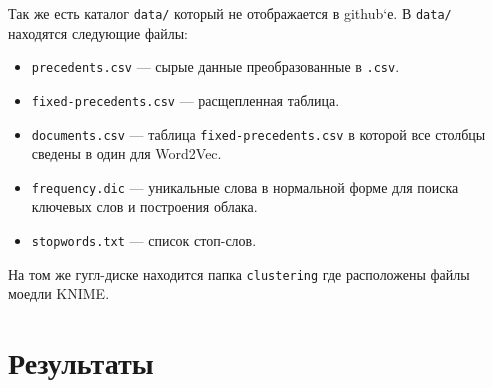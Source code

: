 \documentclass{article}
\begin{document}
Так же есть каталог \texttt{data/} который не отображается в github`е.
В \texttt{data/} находятся следующие файлы:
\begin{itemize}
    \item \texttt{precedents.csv} --- сырые данные преобразованные в \texttt{.csv}.
    \item \texttt{fixed-precedents.csv} --- расщепленная таблица. 
    \item \texttt{documents.csv} --- таблица \texttt{fixed-precedents.csv} в которой все столбцы сведены в один для Word2Vec.
    \item \texttt{frequency.dic} --- уникальные слова в нормальной форме для поиска ключевых слов и построения облака.  
    \item \texttt{stopwords.txt} --- список стоп-слов.
\end{itemize}

На том же гугл-диске находится папка \texttt{clustering} где расположены файлы моедли KNIME. 

\section{Результаты}
        
\end{document}
